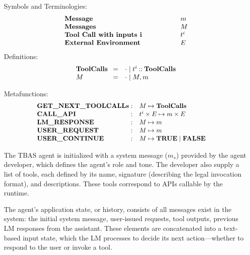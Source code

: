 \noindent
Symbols and Terminologies:
{
\setlength{\abovedisplayskip}{2pt}
\setlength{\belowdisplayskip}{2pt}
\begin{equation}
\begin{array}{l@{\hspace{2cm}}l}
\textbf{Message} & m \\
 \textbf{Messages} & M \\
\textbf{Tool Call with inputs i} & t^{i}  \\
\textbf{External Environment}& E  
\end{array}
\label{list:tbas_syms}
\end{equation}}
\noindent Definitions:
{
\setlength{\abovedisplayskip}{2pt}
\setlength{\belowdisplayskip}{2pt}
\begin{equation}
\begin{array}{l@{\;}rl}
\textbf{ToolCalls} \enspace & =& \cdot \mid t^{i} \mathbin{::}\textbf{ToolCalls}   \\
 M & = & \cdot \mid M, m
\end{array}
\label{list:tbas_defs}
\end{equation}
}


\noindent
Metafunctions:
{
\setlength{\abovedisplayskip}{2pt}
\setlength{\belowdisplayskip}{2pt}
\begin{equation}
\fontsize{9.5}{12}\selectfont %
\hspace*{-5mm}
\begin{array}{l@{\;}rl}
\textbf{GET\_NEXT\_TOOLCALLs} & : & M  \mapsto \textbf{ToolCalls} \\
\textbf{CALL\_API} & : & t^i\times E \mapsto m\times E \\
\textbf{LM\_RESPONSE} & : & M  \mapsto m \\
\textbf{USER\_REQUEST} & : & M  \mapsto m \\
\textbf{USER\_CONTINUE} & : & M  \mapsto \textbf{TRUE}\mid \textbf{FALSE} 
\end{array}
\label{list:tbas_funcs}
\end{equation}
}

The TBAS agent is initialized with a system message ($m_s$) provided by the agent developer, which defines the agent’s role and tone. The developer also supply a list of tools, each defined by its name, signature (describing the legal invocation format), and descriptions. These tools correspond to APIs callable by the runtime.

The agent’s application state, or history, consists of all messages exist in the system: the initial system message, user-issued requests, tool outputs, previous LM responses from the assistant. These elements are concatenated into a text-based input state, which the LM processes to decide its next action—whether to respond to the user or invoke a tool.

